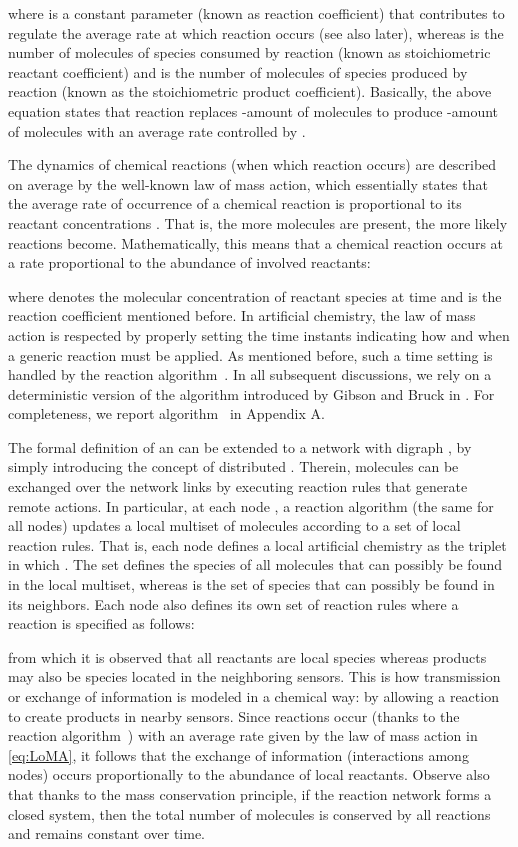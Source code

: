 \documentclass[journal]{IEEEtran}
\newcommand{\artChem}{}
\begin{document}
where  {is a constant parameter (known as reaction coefficient) that contributes to regulate the average rate at which reaction  occurs (see also later)}, whereas  is the number of molecules of species  consumed by reaction  (known as stoichiometric reactant coefficient) and  is the number of molecules of species  produced by reaction  (known as the stoichiometric product coefficient). {Basically, the above equation states that reaction  replaces -amount of molecules  to produce -amount of molecules  with an average rate controlled by .}

{The dynamics of chemical reactions (when which reaction occurs) are described on average by the well-known law of mass action, which essentially states that the average rate of occurrence of a chemical reaction is proportional to its reactant concentrations \cite{Ab86}}. That is, the more molecules are present, the more likely reactions become. Mathematically, this means that a chemical reaction  occurs at a rate  proportional to the abundance of involved
reactants:

where  denotes the molecular concentration of reactant species  at time  {and  is the reaction coefficient mentioned before. In artificial chemistry, the law of mass action is respected by properly setting the time instants indicating how and when a generic reaction must be applied.} As mentioned before, such a time setting is handled by the reaction algorithm~. 
{In all subsequent discussions, we rely on a deterministic version of the algorithm introduced by Gibson and Bruck in \cite{GiBr00}. For completeness, we report algorithm~ in Appendix A.}

The formal definition of an \artChem{} can be extended to a network with digraph ,  {by simply introducing the concept of distributed \artChem{}. Therein, molecules can be} exchanged over the network links by executing reaction rules that generate remote actions. In particular, at each node , a reaction algorithm  (the same for all nodes) updates a local multiset of molecules according to a set of local reaction rules. That is, each node  defines a local artificial chemistry as the triplet  in which . The set  defines the species of all molecules that can possibly be found in the local multiset, {whereas } is the set of species that can possibly be found in its neighbors. Each node also defines its own set of reaction rules  where a reaction  is specified as follows:

from which it is observed that all reactants are local species whereas products may also be species located in the neighboring sensors. This is how transmission or exchange of information is modeled in a chemical way: by allowing a reaction to create products in nearby sensors. {Since reactions occur (thanks to the reaction algorithm~) with an average rate given by the law of mass action in \eqref{eq:LoMA}, it follows that the exchange of information (interactions among nodes) occurs proportionally to the abundance of local reactants.} {Observe also that thanks to the mass conservation principle, if the reaction network forms a closed system, then the total number of molecules is conserved by all reactions and remains constant over time.}
\end{document}
